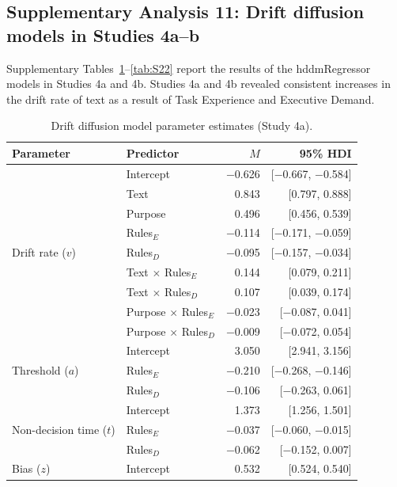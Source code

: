 \documentclass[pdflatex,sn-nature]{sn-jnl}
\begin{document}
\begin{appendices}
\clearpage

\FloatBarrier

\subsection*{Supplementary Analysis 11: Drift diffusion models in Studies 4a--b}
\label{supp:analysis11}
Supplementary Tables~\ref{tab:S19}--\ref{tab:S22} report the results of the hddmRegressor models in Studies 4a and 4b. Studies 4a and 4b revealed consistent increases in the drift rate of text as a result of Task Experience and Executive Demand.

\begin{table}[htbp]
\caption{Drift diffusion model parameter estimates (Study 4a).}
\label{tab:S19}
\begin{tabular*}{\textwidth}{@{\extracolsep{\fill}}llrr@{}}
\toprule
Parameter & Predictor & $M$ & 95\% HDI \\
\midrule
\multirow{9}{*}{Drift rate ($v$)} & Intercept & $-$0.626 & [$-$0.667, $-$0.584] \\
 & Text                              & 0.843  & [0.797, 0.888]   \\
 & Purpose                           & 0.496  & [0.456, 0.539]   \\
 & Rules$_E$                         & $-$0.114 & [$-$0.171, $-$0.059] \\
 & Rules$_D$                         & $-$0.095 & [$-$0.157, $-$0.034] \\
 & Text $\times$ Rules$_E$           & 0.144  & [0.079, 0.211]   \\
 & Text $\times$ Rules$_D$           & 0.107  & [0.039, 0.174]   \\
 & Purpose $\times$ Rules$_E$        & $-$0.023 & [$-$0.087, 0.041] \\
 & Purpose $\times$ Rules$_D$        & $-$0.009 & [$-$0.072, 0.054] \\
\midrule
\multirow{3}{*}{Threshold ($a$)} & Intercept & 3.050 & [2.941, 3.156] \\
 & Rules$_E$                         & $-$0.210 & [$-$0.268, $-$0.146] \\
 & Rules$_D$                         & $-$0.106 & [$-$0.263, 0.061]  \\
\midrule
\multirow{3}{*}{Non-decision time ($t$)} & Intercept & 1.373 & [1.256, 1.501] \\
 & Rules$_E$                         & $-$0.037 & [$-$0.060, $-$0.015] \\
 & Rules$_D$                         & $-$0.062 & [$-$0.152, 0.007]  \\
\midrule
Bias ($z$) & Intercept & 0.532 & [0.524, 0.540] \\
\bottomrule
\end{tabular*}
\end{table}


\end{appendices}
\end{document}
